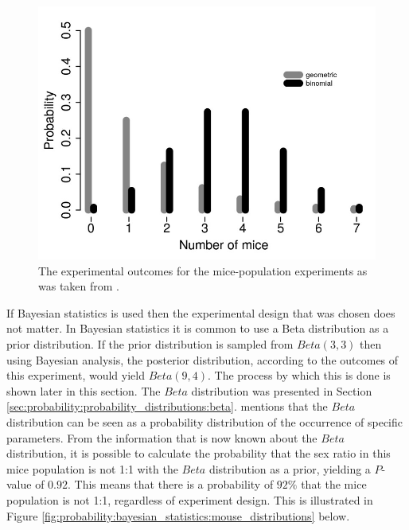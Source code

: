 \begin{figure}[htbp]
    \includegraphics[width=\textwidth]{images/mouse_experiment_outcome.jpg}
    \caption{The experimental outcomes for the mice-population experiments as was taken from \cite{ref:hackenberger:2019} .}
    \label{fig:probability:bayesian_statistics:mouse_experiment_outcome}
\end{figure}

If Bayesian statistics is used then the experimental design that was chosen does not matter. In Bayesian statistics it is common to use a Beta distribution as a prior distribution. If the prior distribution is sampled from $Beta(3,3)$ then using Bayesian analysis, the posterior distribution, according to the outcomes of this experiment, would yield $Beta(9,4)$. The process by which this is done is shown later in this section. The $Beta$ distribution was presented in Section \ref{sec:probability:probability_distributions:beta}. \citeauthor{ref:hackenberger:2019} \cite{ref:hackenberger:2019} mentions that the $Beta$ distribution can be seen as a probability distribution of the occurrence of specific parameters. From the information that is now known about the $Beta$ distribution, it is possible to calculate the probability that the sex ratio in this mice population is not 1:1 with the $Beta$ distribution as a prior, yielding a $P$-value of $0.92$. This means that there is a probability of $92\%$ that the mice population is not 1:1, regardless of experiment design. This is illustrated in Figure \ref{fig:probability:bayesian_statistics:mouse_distributions} below.

